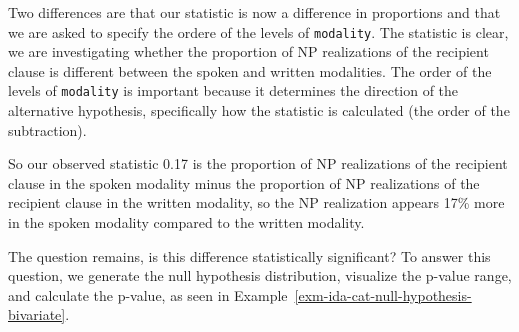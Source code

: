 \documentclass[
  letterpaper,
  DIV=11,
  numbers=noendperiod]{scrreprt}
\theoremstyle{definition}
\theoremstyle{remark}
\begin{document}
Two differences are that our statistic is now a difference in
proportions and that we are asked to specify the ordere of the levels of
\texttt{modality}. The statistic is clear, we are investigating whether
the proportion of NP realizations of the recipient clause is different
between the spoken and written modalities. The order of the levels of
\texttt{modality} is important because it determines the direction of
the alternative hypothesis, specifically how the statistic is calculated
(the order of the subtraction).

So our observed statistic 0.17 is the proportion of NP realizations of
the recipient clause in the spoken modality minus the proportion of NP
realizations of the recipient clause in the written modality, so the NP
realization appears 17\% more in the spoken modality compared to the
written modality.

The question remains, is this difference statistically significant? To
answer this question, we generate the null hypothesis distribution,
visualize the p-value range, and calculate the p-value, as seen in
Example~\ref{exm-ida-cat-null-hypothesis-bivariate}.
\end{document}
